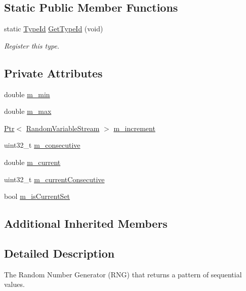 \subsection*{Static Public Member Functions}
\begin{DoxyCompactItemize}
\item 
static \hyperlink{classns3_1_1TypeId}{Type\+Id} \hyperlink{classns3_1_1SequentialRandomVariable_a0d5681ef517e100c2a3ad5f8dccd9dc7}{Get\+Type\+Id} (void)
\begin{DoxyCompactList}\small\item\em Register this type. \end{DoxyCompactList}\end{DoxyCompactItemize}
\subsection*{Private Attributes}
\begin{DoxyCompactItemize}
\item 
double \hyperlink{classns3_1_1SequentialRandomVariable_a168c620d4730301c20caab6abcbd00dc}{m\+\_\+min}
\item 
double \hyperlink{classns3_1_1SequentialRandomVariable_ab3ab59c289b5ee0751562c5e46020def}{m\+\_\+max}
\item 
\hyperlink{classns3_1_1Ptr}{Ptr}$<$ \hyperlink{classns3_1_1RandomVariableStream}{Random\+Variable\+Stream} $>$ \hyperlink{classns3_1_1SequentialRandomVariable_abb30c71cae8727ea8c2330f0dc309e6f}{m\+\_\+increment}
\item 
uint32\+\_\+t \hyperlink{classns3_1_1SequentialRandomVariable_a4c6baa5a3e757ccee2928b8d4ba9fcf3}{m\+\_\+consecutive}
\item 
double \hyperlink{classns3_1_1SequentialRandomVariable_a91885067ac2516545153f122666ea6ac}{m\+\_\+current}
\item 
uint32\+\_\+t \hyperlink{classns3_1_1SequentialRandomVariable_a04bb3e0a4537b255340d174f827d463c}{m\+\_\+current\+Consecutive}
\item 
bool \hyperlink{classns3_1_1SequentialRandomVariable_afa73acac6f4f810d2ff71e794a5a0c2d}{m\+\_\+is\+Current\+Set}
\end{DoxyCompactItemize}
\subsection*{Additional Inherited Members}


\subsection{Detailed Description}
The Random Number Generator (R\+NG) that returns a pattern of sequential values. 

